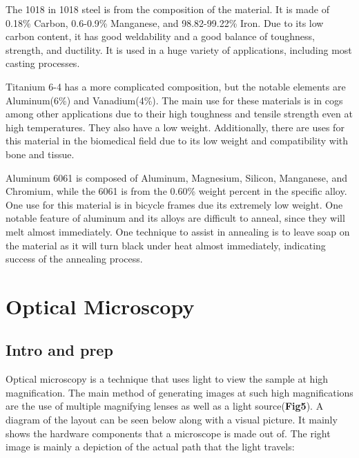 \documentclass{article}
\begin{document}
The 1018 in 1018 steel is from the composition of the material. It is made of 0.18\% Carbon, 0.6-0.9\% Manganese, and 98.82-99.22\% Iron. Due to its low carbon content, it has good weldability and a good balance of toughness, strength, and ductility. It is used in a huge variety of applications, including most casting processes.

Titanium 6-4 has a more complicated composition, but the notable elements are Aluminum(6\%) and Vanadium(4\%). The main use for these materials is in cogs among other applications due to their high toughness and tensile strength even at high temperatures. They also have a low weight. Additionally, there are uses for this material in the biomedical field due to its low weight and compatibility with bone and tissue.

Aluminum 6061 is composed of Aluminum, Magnesium, Silicon, Manganese, and Chromium, while the 6061 is from the 0.60\% weight percent in the specific alloy. One use for this material is in bicycle frames due its extremely low weight. One notable feature of aluminum and its alloys are difficult to anneal, since they will melt almost immediately. One technique to assist in annealing is to leave soap on the material as it will turn black under heat almost immediately, indicating success of the annealing process.

\section{Optical Microscopy}

\subsection{Intro and prep}

Optical microscopy is a technique that uses light to view the sample at high magnification. The main method of generating images at such high magnifications are the use of multiple magnifying lenses as well as a light source(\textbf{Fig5}). A diagram of the layout can be seen below along with a visual picture. It mainly shows the hardware components that a microscope is made out of. The right image is mainly a depiction of the actual path that the light travels:
\end{document}
